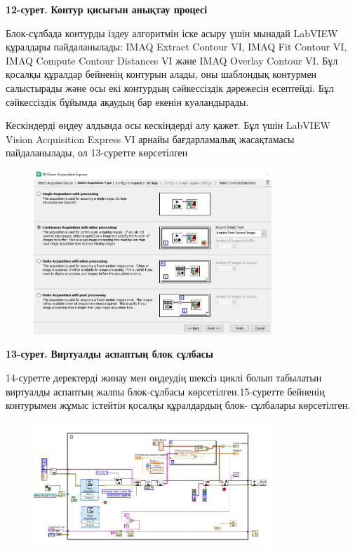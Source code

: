 {\bfseries 12-сурет.} {\bfseries Контур қисығын анықтау процесі}

Блок-сұлбада контурды іздеу алгоритмін іске асыру үшін мынадай LabVIEW
құралдары пайдаланылады: IMAQ Extract Contour VI, IMAQ Fit Contour VI,
IMAQ Compute Contour Distances VI және IMAQ Overlay Contour VI. Бұл
қосалқы құралдар бейненің контурын алады, оны шаблондық контурмен
салыстырады және осы екі контурдың сәйкессіздік дәрежесін есептейді. Бұл
сәйкессіздік бұйымда ақаудың бар екенін куәландырады.

Кескіндерді өңдеу алдында осы кескіндерді алу қажет. Бұл үшін LabVIEW
Vision Acquisition Express VI арнайы бағдарламалық жасақтамасы
пайдаланылады, ол 13-суретте көрсетілген


\begin{figure}[H]
	\centering
	\includegraphics[width=0.8\textwidth]{media/ict2/image181}
	\caption*{}
\end{figure}


{\bfseries 13-сурет.} {\bfseries Виртуалды аспаптың блок сұлбасы}

14-суретте деректерді жинау мен өңдеудің шексіз циклі болып табылатын
виртуалды аспаптың жалпы блок-сұлбасы көрсетілген.15-суретте бейненің
контурымен жұмыс істейтін қосалқы құралдардың блок- сұлбалары
көрсетілген.


\begin{figure}[H]
	\centering
	\includegraphics[width=0.8\textwidth]{media/ict2/image182}
	\caption*{}
\end{figure}



